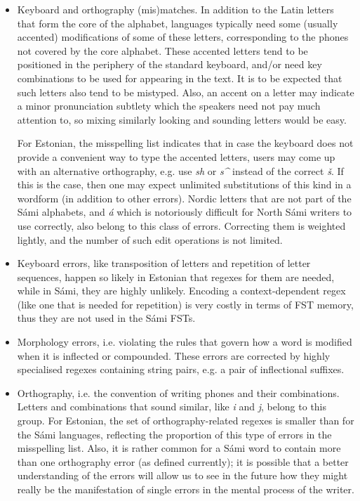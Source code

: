 \documentclass{flammie}
\begin{document}
\begin{itemize}
\item Keyboard and orthography (mis)matches. In addition to the Latin letters
    that form the core of the alphabet, languages typically need some (usually
        accented) modifications of some of these letters, corresponding to the
        phones not covered by the core alphabet. These accented letters tend to
        be positioned in the periphery of the standard keyboard, and/or need
        key combinations to be used for appearing in the text. It is to be
        expected that such letters also tend to be mistyped. Also, an accent on
        a letter may indicate a minor pronunciation subtlety which the speakers
        need not pay much attention to, so mixing similarly looking and sounding
        letters would be easy.

For Estonian, the misspelling list indicates that in case the keyboard does not
        provide a convenient way to type the accented letters, users may come up
        with an alternative orthography, e.g. use \textit{sh} or \textit{s\^{}}
        instead of the correct \textit{š}. If this is the case, then one may
        expect unlimited substitutions of this kind in a wordform (in addition
        to other errors). Nordic letters that are not part of the Sámi
        alphabets, and \textit{á} which is notoriously difficult for North Sámi
        writers to use correctly, also belong to this class of errors.
        Correcting them is weighted lightly, and the number of such edit
        operations is not limited.

\item Keyboard errors, like transposition of letters and repetition of letter
    sequences, happen so likely in Estonian that regexes for them are needed,
        while  in Sámi, they are highly unlikely. Encoding a context-dependent
        regex (like one that is needed for repetition) is very costly in terms
        of FST memory, thus they are not used in the Sámi FSTs.

\item Morphology errors, i.e. violating the rules that govern how a word is
    modified when it is inflected or compounded.  These errors are corrected by
        highly specialised regexes containing string pairs, e.g. a pair of
        inflectional suffixes.

\item Orthography, i.e. the convention of writing phones and their combinations.
    Letters and combinations that sound similar, like \textit{i} and \textit{j},
        belong to this group. For Estonian, the set of orthography-related
        regexes is smaller than for the Sámi languages, reflecting the
        proportion of this type of errors in the misspelling list. Also, it is
        rather common for a Sámi word to contain more than one orthography error
        (as defined currently); it is possible that a better understanding of
        the errors will allow us to see in the future how they might really be
        the manifestation of single errors in the mental process of the writer.
\end{itemize}
\end{document}
